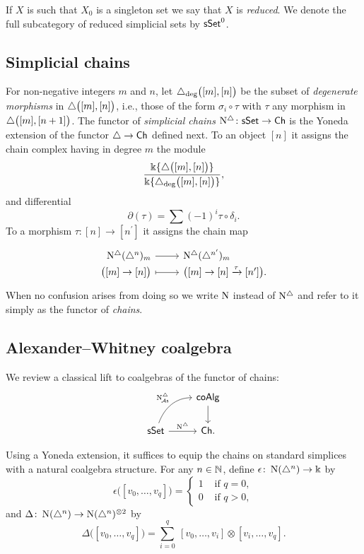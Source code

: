 If $X$ is such that $X_0$ is a singleton set we say that $X$ is \textit{reduced}.
We denote the full subcategory of reduced simplicial sets by $\mathsf{sSet}^0$.

\subsection{Simplicial chains} \label{ss:simplicial sets}

For non-negative integers $m$ and $n$, let $\triangle_{\deg} \big( [m], [n] \big)$ be the subset of \textit{degenerate morphisms} in $\triangle \big( [m], [n] \big)$, i.e., those of the form $\sigma_i \circ \tau$ with $\tau$ any morphism in $\triangle \big( [m], [n+1] \big)$.
The functor of \textit{simplicial chains} $\operatorname{N^{\triangle}} \colon \mathsf{sSet} \to \mathsf{Ch}$ is the Yoneda extension of the functor $\triangle \to \mathsf{Ch}$ defined next.
To an object $[n]$ it assigns the chain complex having in degree $m$ the module
\[
\frac{\Bbbk\{\triangle \big( [m], [n] \big) \}}{\Bbbk\{\triangle_{\deg} \big( [m], [n] \big) \}},
\]
and differential
\[
\partial(\tau) = \sum (-1)^i \tau \circ \delta_i.
\]
To a morphism $\tau \colon [n] \to [n^\prime]$ it assigns the chain map
\[
\begin{tikzcd}[row sep=-3pt, column sep=normal,
/tikz/column 1/.append style={anchor=base east},
/tikz/column 2/.append style={anchor=base west}]
\schains(\simplex^n)_m \arrow[r] & \schains(\simplex^{n^\prime})_m \\
\big( [m] \to [n] \big) \arrow[r, mapsto] & \big( [m] \to [n] \xra{\tau} [n^\prime] \big).
\end{tikzcd}
\]
When no confusion arises from doing so we write $\operatorname{N}$ instead of $\operatorname{N^{\triangle}}$ and refer to it simply as the functor of \textit{chains}.

\subsection{Alexander--Whitney coalgebra} \label{ss:aw coalgebra}

We review a classical lift to coalgebras of the functor of chains:
\[
\begin{tikzcd}
& \coAlg \arrow[d] \\
\sSet \arrow[r, "\schains"] \arrow[ur, "\schainsA", out=70, in=180] & \Ch.
\end{tikzcd}
\]

Using a Yoneda extension, it suffices to equip the chains on standard simplices with a natural coalgebra structure.
For any $n \in \mathbb{N}$, define $\epsilon \colon \operatorname{N}(\triangle^n) \to \Bbbk$ by
\[
\epsilon \big( [v_0, \dots, v_q] \big) = \begin{cases} 1 & \text{ if } q = 0, \\ 0 & \text{ if } q>0, \end{cases}
\]
and $\Delta \colon \operatorname{N}(\triangle^n) \to \operatorname{N}(\triangle^n)^{\otimes2}$ by
\[
\Delta \big( [v_0, \dots, v_q] \big) = \sum_{i=0}^q \ [v_0, \dots, v_i] \otimes [v_i, \dots, v_q].
\]

